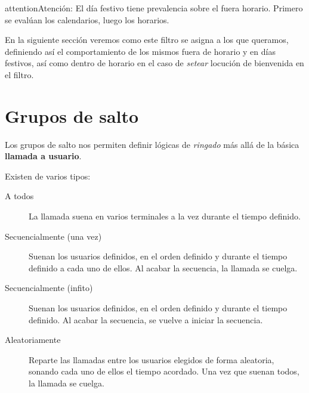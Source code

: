 \documentclass[letterpaper,10pt,spanish]{sphinxmanual}
\begin{document}
\begin{notice}{attention}{Atención:}
El día festivo tiene prevalencia sobre el fuera horario. Primero se evalúan los calendarios, luego los horarios.
\end{notice}

En la siguiente sección veremos como este filtro se asigna a los {\hyperref[pbx_features/external_ddis:external\string-ddis]{}} que queramos, definiendo así el comportamiento de los mismos fuera de horario y en días festivos, así como dentro de horario en el caso de \emph{setear} locución de bienvenida en el filtro.


\section{Grupos de salto}
\label{pbx_features/huntgroups:grupos-de-salto}\label{pbx_features/huntgroups::doc}\label{pbx_features/huntgroups:huntgroups}
Los grupos de salto nos permiten definir lógicas de \emph{ringado} más allá de la básica \textbf{llamada a usuario}.

Existen de varios tipos:
\begin{description}
\item[{A todos}] \leavevmode{}\label{pbx_features/huntgroups:term-a-todos}
La llamada suena en varios terminales a la vez durante el tiempo definido.

\item[{Secuencialmente (una vez)}] \leavevmode{}\label{pbx_features/huntgroups:term-secuencialmente-una-vez}
Suenan los usuarios definidos, en el orden definido y durante el tiempo definido a cada uno de ellos. Al acabar la secuencia, la llamada se cuelga.

\item[{Secuencialmente (infito)}] \leavevmode{}\label{pbx_features/huntgroups:term-secuencialmente-infito}
Suenan los usuarios definidos, en el orden definido y durante el tiempo definido. Al acabar la secuencia, se vuelve a iniciar la secuencia.

\item[{Aleatoriamente}] \leavevmode{}\label{pbx_features/huntgroups:term-aleatoriamente}
Reparte las llamadas entre los usuarios elegidos de forma aleatoria, sonando cada uno de ellos el tiempo acordado. Una vez que suenan todos, la llamada se cuelga.

\end{description}
\end{document}
